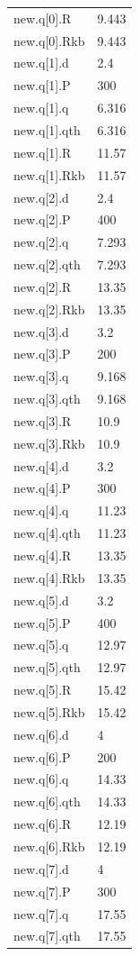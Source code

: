 {\begin{longtable}{p{}p{}}
{}new.q[0].R & 9.443\\
{}new.q[0].Rkb & 9.443\\
{}new.q[1].d & 2.4\\
{}new.q[1].P & 300\\
{}new.q[1].q & 6.316\\
{}new.q[1].qth & 6.316\\
{}new.q[1].R & 11.57\\
{}new.q[1].Rkb & 11.57\\
{}new.q[2].d & 2.4\\
{}new.q[2].P & 400\\
{}new.q[2].q & 7.293\\
{}new.q[2].qth & 7.293\\
{}new.q[2].R & 13.35\\
{}new.q[2].Rkb & 13.35\\
{}new.q[3].d & 3.2\\
{}new.q[3].P & 200\\
{}new.q[3].q & 9.168\\
{}new.q[3].qth & 9.168\\
{}new.q[3].R & 10.9\\
{}new.q[3].Rkb & 10.9\\
{}new.q[4].d & 3.2\\
{}new.q[4].P & 300\\
{}new.q[4].q & 11.23\\
{}new.q[4].qth & 11.23\\
{}new.q[4].R & 13.35\\
{}new.q[4].Rkb & 13.35\\
{}new.q[5].d & 3.2\\
{}new.q[5].P & 400\\
{}new.q[5].q & 12.97\\
{}new.q[5].qth & 12.97\\
{}new.q[5].R & 15.42\\
{}new.q[5].Rkb & 15.42\\
{}new.q[6].d & 4\\
{}new.q[6].P & 200\\
{}new.q[6].q & 14.33\\
{}new.q[6].qth & 14.33\\
{}new.q[6].R & 12.19\\
{}new.q[6].Rkb & 12.19\\
{}new.q[7].d & 4\\
{}new.q[7].P & 300\\
{}new.q[7].q & 17.55\\
{}new.q[7].qth & 17.55\\

\end{longtable}}
